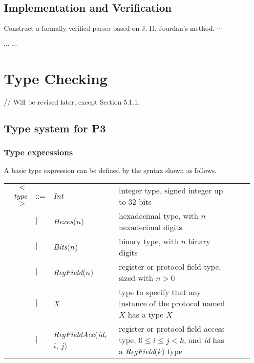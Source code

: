\documentclass{article}
\begin{document}
\subsection{Implementation and Verification} \label{Parser Implementation and Verification}

Construct a formally verified parser based on J.-H. Jourdan's method. $\cdots$

\begin{flushleft}
$\cdots$ $\cdots$
\end{flushleft}


\section{Type Checking}

// Will be revised later, except Section 5.1.1.

\subsection{Type system for P3}

\subsubsection{Type expressions}


A basic type expression can be defined by the syntax
shown as follows.

    \small

        \begin{tabularx}{1.0\linewidth}{rm{1em}m{10em}m{18em}ll}
          $<$\textit{type}$>$    & ::= &  \textit{Int} & integer type,  signed integer up to 32 bits \\
                     & \hspace*{0.3cm} $\mid$ &  \textit{Hexes}($n$) & hexadecimal type, with $n$ hexadecimal digits \\
                     & \hspace*{0.3cm} $\mid$ &  \textit{Bits}($n$) &binary type, with $n$  binary digits  \\
                     & \hspace*{0.3cm} $\mid$ &  \textit{RegField}($n$) & register or protocol field type, sized with $n>0$  \\
                     & \hspace*{0.3cm} $\mid$ &  \textit{X} & type to specify that any instance of the protocol named $X$ has a type $X$  \\
                     & \hspace*{0.3cm} $\mid$ &  \textit{RegFieldAcc}(\textit{id}, $i$, $j$) & register or protocol field access type, $0\leq i \leq j < k$, and \textit{id} has a \textit{RegField}($k$) type
		\end{tabularx}
        \normalsize
\end{document}
